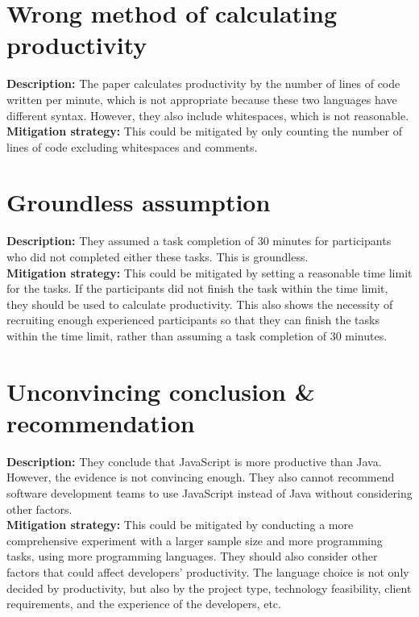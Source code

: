 \documentclass{article}
\begin{document}
\section{Wrong method of calculating productivity}
\textbf{Description:} The paper calculates productivity by the number of lines of code written per minute, which is not appropriate because these two languages have different syntax. However, they also include whitespaces, which is not reasonable.\\
\textbf{Mitigation strategy:} This could be mitigated by only counting the number of lines of code excluding whitespaces and comments.

\section{Groundless assumption}
\textbf{Description:} They assumed a task completion of 30 minutes for participants who did not completed either these tasks. This is groundless.\\
\textbf{Mitigation strategy:} This could be mitigated by setting a reasonable time limit for the tasks. If the participants did not finish the task within the time limit, they should be used to calculate productivity. This also shows the necessity of recruiting enough experienced participants so that they can finish the tasks within the time limit, rather than assuming a task completion of 30 minutes.

\section{Unconvincing conclusion \& recommendation}
\textbf{Description:} They conclude that JavaScript is more productive than Java. However, the evidence is not convincing enough. They also cannot recommend software development teams to use JavaScript instead of Java without considering other factors.\\
\textbf{Mitigation strategy:} This could be mitigated by conducting a more comprehensive experiment with a larger sample size and more programming tasks, using more programming languages. They should also consider other factors that could affect developers' productivity. The language choice is not only decided by productivity, but also by the project type, technology feasibility, client requirements, and the experience of the developers, etc.
\end{document}
